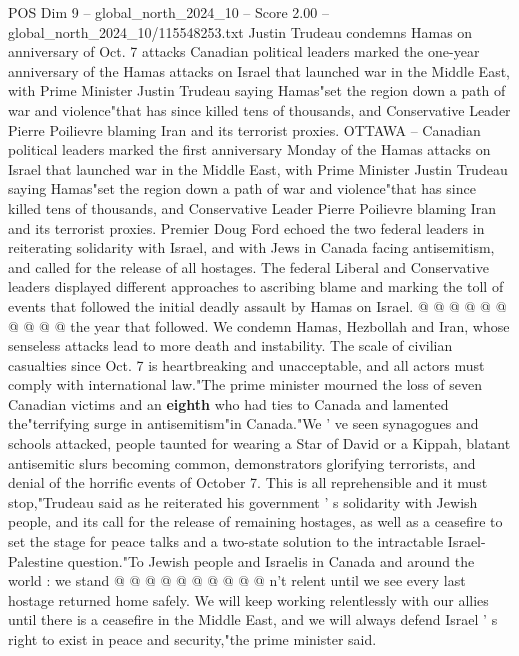 \begin{textsample}{POS Dim 9 – global\_north\_2024\_10 – Score 2.00 – global\_north\_2024\_10/115548253.txt}  \label{ex:f9_pos_221}
Justin Trudeau condemns Hamas on anniversary of Oct. 7 attacks Canadian political leaders marked the one-year anniversary of the Hamas attacks on Israel that launched war in the Middle East, with Prime Minister Justin Trudeau saying Hamas"set the region down a path of war and violence"that has since killed tens of thousands, and Conservative Leader Pierre Poilievre blaming Iran and its terrorist proxies.
OTTAWA -- Canadian political leaders marked the first anniversary Monday of the Hamas attacks on Israel that launched war in the Middle East, with Prime Minister Justin Trudeau saying Hamas"set the region down a path of war and violence"that has since killed tens of thousands, and Conservative Leader Pierre Poilievre blaming Iran and its terrorist proxies.
Premier Doug Ford echoed the two federal leaders in reiterating solidarity with Israel, and with Jews in Canada facing antisemitism, and called for the release of all hostages.
The federal Liberal and Conservative leaders displayed different approaches to ascribing blame and marking the toll of events that followed the initial deadly assault by Hamas on Israel. @ @ @ @ @ @ @ @ @ @ the year that followed.
We condemn Hamas, Hezbollah and Iran, whose senseless attacks lead to more death and instability.
The scale of civilian casualties since Oct. 7 is heartbreaking and unacceptable, and all actors must comply with international law."The prime minister mourned the loss of seven Canadian victims and an \textbf{eighth} who had ties to Canada and lamented the"terrifying surge in antisemitism"in Canada."We ' ve seen synagogues and schools attacked, people taunted for wearing a Star of David or a Kippah, blatant antisemitic slurs becoming common, demonstrators glorifying terrorists, and denial of the horrific events of October 7.
This is all reprehensible and it must stop,"Trudeau said as he reiterated his government ' s solidarity with Jewish people, and its call for the release of remaining hostages, as well as a ceasefire to set the stage for peace talks and a two-state solution to the intractable Israel-Palestine question."To Jewish people and Israelis in Canada and around the world : we stand @ @ @ @ @ @ @ @ @ @ n't relent until we see every last hostage returned home safely.
We will keep working relentlessly with our allies until there is a ceasefire in the Middle East, and we will always defend Israel ' s right to exist in peace and security,"the prime minister said.

\end{textsample}
